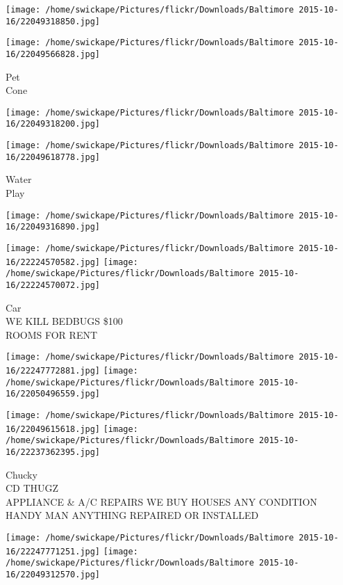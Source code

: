 \documentclass[10pt,letterpaper]{article}
\begin{document}
\texttt{[image: /home/swickape/Pictures/flickr/Downloads/Baltimore 2015-10-16/22049318850.jpg]}

\vspace{0.25in}
\texttt{[image: /home/swickape/Pictures/flickr/Downloads/Baltimore 2015-10-16/22049566828.jpg]}

Pet\\
Cone
\pagebreak

\texttt{[image: /home/swickape/Pictures/flickr/Downloads/Baltimore 2015-10-16/22049318200.jpg]}

\vspace{0.25in}
\texttt{[image: /home/swickape/Pictures/flickr/Downloads/Baltimore 2015-10-16/22049618778.jpg]}

Water\\
Play
\pagebreak

\texttt{[image: /home/swickape/Pictures/flickr/Downloads/Baltimore 2015-10-16/22049316890.jpg]}

\vspace{0.25in}
\texttt{[image: /home/swickape/Pictures/flickr/Downloads/Baltimore 2015-10-16/22224570582.jpg]}
\texttt{[image: /home/swickape/Pictures/flickr/Downloads/Baltimore 2015-10-16/22224570072.jpg]}

Car\\
WE KILL BEDBUGS \$100\\
ROOMS FOR RENT
\pagebreak

\texttt{[image: /home/swickape/Pictures/flickr/Downloads/Baltimore 2015-10-16/22247772881.jpg]}
\texttt{[image: /home/swickape/Pictures/flickr/Downloads/Baltimore 2015-10-16/22050496559.jpg]}

\texttt{[image: /home/swickape/Pictures/flickr/Downloads/Baltimore 2015-10-16/22049615618.jpg]}
\texttt{[image: /home/swickape/Pictures/flickr/Downloads/Baltimore 2015-10-16/22237362395.jpg]}

Chucky\\
CD THUGZ\\
APPLIANCE \& A/C REPAIRS WE BUY HOUSES ANY CONDITION\\
HANDY MAN ANYTHING REPAIRED OR INSTALLED
\pagebreak

\texttt{[image: /home/swickape/Pictures/flickr/Downloads/Baltimore 2015-10-16/22247771251.jpg]}
\texttt{[image: /home/swickape/Pictures/flickr/Downloads/Baltimore 2015-10-16/22049312570.jpg]}
\end{document}
